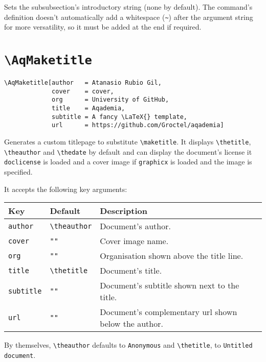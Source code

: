 Sets the subsubsection's introductory string (none by default).
The command's definition doesn't automatically add a whitespace (\texttt{\~{}}) after the argument string for more versatility, so it must be added at the end if required.

\section{\texttt{\textbackslash{}AqMaketitle}}

\begin{lstlisting}[language=Tex]
\AqMaketitle[author   = Atanasio Rubio Gil,
             cover    = cover,
             org      = University of GitHub,
             title    = Aqademia,
             subtitle = A fancy \LaTeX{} template,
             url      = https://github.com/Groctel/aqademia]
\end{lstlisting}

Generates a custom titlepage to substitute \texttt{\textbackslash{}maketitle}.
It displays \texttt{\textbackslash{}thetitle}, \texttt{\textbackslash{}theauthor} and \texttt{\textbackslash{}thedate} by default and can display the document's license it \texttt{doclicense} is loaded and a cover image if \texttt{graphicx} is loaded and the image is specified.

\pagebreak

It accepts the following key arguments:

\begin{center}
\begin{tabular}{l l l}
	\textbf{Key}      & \textbf{Default}                   & \textbf{Description}                                 \\
	\toprule
	\texttt{author}   & \texttt{\textbackslash{}theauthor} & Document's author.                                   \\
	\texttt{cover}    & \texttt{""}                        & Cover image name.                                    \\
	\texttt{org}      & \texttt{""}                        & Organisation shown above the title line.             \\
	\texttt{title}    & \texttt{\textbackslash{}thetitle}  & Document's title.                                    \\
	\texttt{subtitle} & \texttt{""}                        & Document's subtitle shown next to the title.         \\
	\texttt{url}      & \texttt{""}                        & Document's complementary url shown below the author. \\

\end{tabular}
\end{center}

By themselves, \texttt{\textbackslash{}theauthor} defaults to \texttt{Anonymous} and \texttt{\textbackslash{}thetitle}, to \texttt{Untitled document}.
